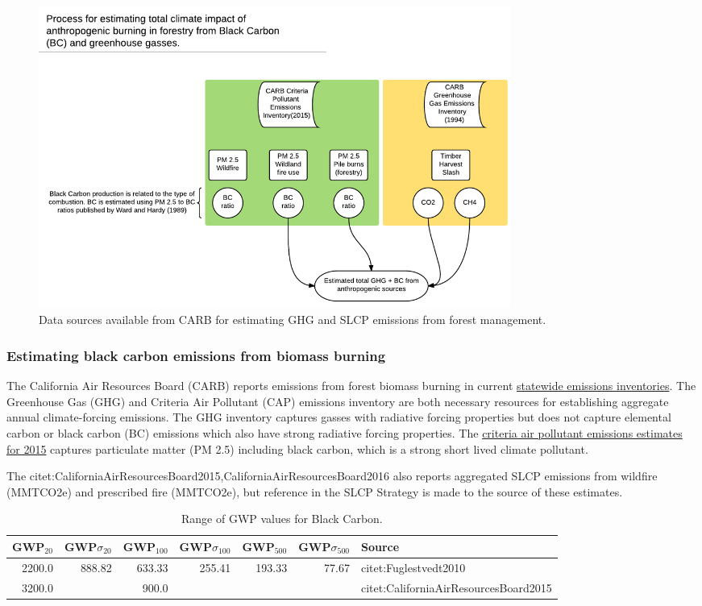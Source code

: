\documentclass[a4paper]{article}
\begin{document}
\begin{figure}[htb]
\centering
\includegraphics[width=0.75\textwidth]{./graphics/burning.pdf}
\caption{Data sources available from CARB for estimating GHG and SLCP emissions from forest management.}
\end{figure}


\subsubsection{Estimating black carbon emissions from biomass burning}
\label{sec-1-2-1}

The California Air Resources Board (CARB) reports
emissions from forest biomass burning  in current
\href{http://www.arb.ca.gov/ei/ei.htm}{statewide emissions inventories}. The Greenhouse Gas (GHG) and Criteria Air
Pollutant (CAP) emissions inventory are both necessary resources for establishing
aggregate annual climate-forcing emissions. The GHG inventory captures
gasses with radiative forcing properties but does not capture elemental
carbon or black carbon (BC) emissions which also have strong radiative
forcing properties. The
\href{http://www.arb.ca.gov/ei/emissiondata.htm}{criteria air pollutant
emissions estimates for 2015} captures particulate matter (PM 2.5) including black carbon, which
is a strong short lived climate pollutant.


The citet:CaliforniaAirResourcesBoard2015,CaliforniaAirResourcesBoard2016
also reports aggregated SLCP emissions from wildfire
(MMTCO2e) and prescribed fire
(MMTCO2e), but reference in the
SLCP Strategy is made to the source of these estimates.



\begin{table}[htb]
\caption{Range of GWP values for Black Carbon.}
\centering
\begin{tabular}{rrrrrrl}
GWP$_{\text{20}}$ & GWP$\sigma$$_{\text{20}}$ & GWP$_{\text{100}}$ & GWP$\sigma$$_{\text{100}}$ & GWP$_{\text{500}}$ & GWP$\sigma$$_{\text{500}}$ & Source\\
\hline
2200.0 & 888.82 & 633.33 & 255.41 & 193.33 & 77.67 & citet:Fuglestvedt2010\\
3200.0 &  & 900.0 &  &  &  & citet:CaliforniaAirResourcesBoard2015\\
\end{tabular}
\end{table}
\end{document}
